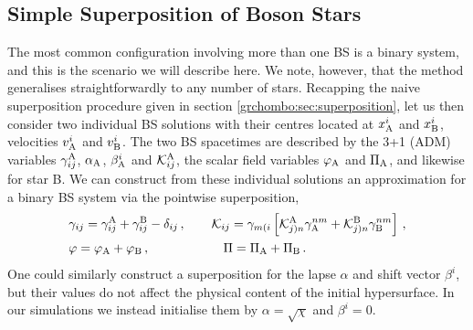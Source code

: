 \subsection{Simple Superposition of Boson Stars}
%
\label{mal:sec:superpossimple}
The most common configuration involving more than one BS
is a binary system, and this is the scenario we will
describe here. We note, however, that the method
generalises straightforwardly to any number of stars. Recapping the naive superposition
procedure given in section \ref{grchombo:sec:superposition},
let us then consider two individual BS solutions
with their centres located at $x^i_{\rm A}$ and $x^i_{\rm B}$,
velocities $v_{\rm A}^i$ and $v_{\rm B}^i$.
The two BS spacetimes are
described by the 3+1 (ADM) variables $\gamma_{ij}^{\rm A}$,
$\alpha_{\rm A}$, $\beta_{\rm A}^i$ and ${\mathcal{K}}_{ij}^{\rm A}$,
the scalar field variables $\varphi_{\rm A}$ and $\Pi_{\rm A}$,
and likewise for star B. We can construct from these
individual solutions an approximation for a binary BS system
via the pointwise superposition,
%
\begin{align}
  &\gamma_{ij} =
  \gamma_{ij}^{\rm A}
  +\gamma_{ij}^{\rm B}
  -\delta_{ij}\,,~~~~~~
  {\mathcal{K}}_{ij} = \gamma_{m(i}
  \left[
  {\mathcal{K}}^{\rm A}_{j)n}
  \gamma_{\rm A}^{nm}
  +{\mathcal{K}}^{\rm B}_{j)n}
  \gamma_{\rm B}^{nm}
  \right]\,,
  \nonumber \\
  &\varphi = \varphi_{\rm A} + \varphi_{\rm B}\,,
  \hspace{0.85cm}~~~~~~~~~~
  \Pi = \Pi_{\rm A} + \Pi_{\rm B}\,.
  \label{mal:eq:superpossimple}
\end{align}
%
One could similarly construct a superposition for the lapse
$\alpha$ and shift vector $\beta^i$, but their values do not
affect the physical content of the initial hypersurface.
In our simulations we instead initialise them by
$\alpha=\sqrt{\chi}$ and $\beta^i=0$.

